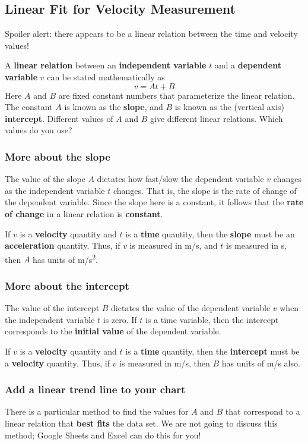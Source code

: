 \subsection{Linear Fit for Velocity Measurement}
%
Spoiler alert: there appears to be a linear relation between the time and velocity values!

A \textbf{linear relation} between an \textbf{independent variable} $t$ and a \textbf{dependent variable} $v$ can be stated mathematically as
\begin{equation}
    v = A t + B
\end{equation}
Here $A$ and $B$ are fixed constant numbers that parameterize the linear relation. The constant $A$ is known as the \textbf{slope}, and $B$ is known as the (vertical axis) \textbf{intercept}. Different values of $A$ and $B$ give different linear relations. Which values do you use?
%
\subsubsection{More about the slope}
%
The value of the slope $A$ dictates how fast/slow the dependent variable $v$ changes as the independent variable $t$ changes. That is, the slope is the rate of change of the dependent variable. Since the slope here is a constant, it follows that the \textbf{rate of change} in a linear relation is \textbf{constant}.

If $v$ is a \textbf{velocity} quantity and $t$ is a \textbf{time} quantity, then the \textbf{slope} must be an \textbf{acceleration} quantity. Thus, if $v$ is measured in m/s, and $t$ is measured in s, then $A$ has units of m/s\textsuperscript{2}.
%
\subsubsection{More about the intercept}
%
The value of the intercept $B$ dictates the value of the dependent variable $v$ when the independent variable $t$ is zero. If $t$ is a time variable, then the intercept corresponds to the \textbf{initial value} of the dependent variable.

If $v$ is a \textbf{velocity} quantity and $t$ is a \textbf{time} quantity, then the \textbf{intercept} must be a \textbf{velocity} quantity. Thus, if $v$ is measured in m/s, then $B$ has units of m/s also.
%
\subsubsection{Add a linear trend line to your chart}
%
There is a particular method to find the values for $A$ and $B$ that correspond to a linear relation that \textbf{best fits} the data set. We are not going to discuss this method; Google Sheets and Excel can do this for you!

